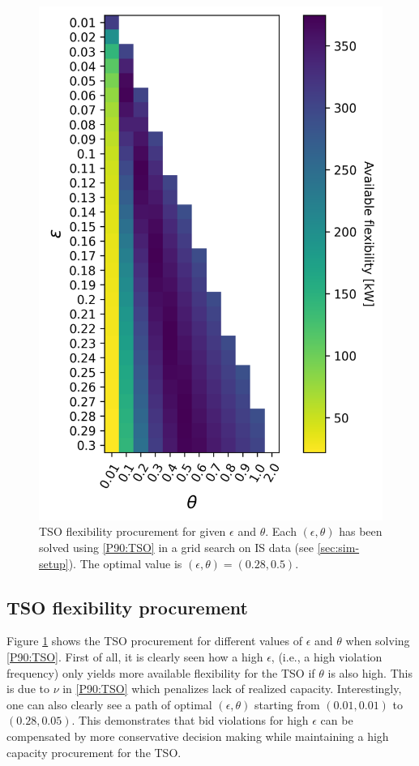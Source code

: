 \documentclass[conference]{IEEEtran}
\begin{document}
\begin{figure}[!t]
    \centering
    \includegraphics[width=0.95\columnwidth]{../figures/heatmap.png}
    \caption{\small{\ac{TSO} flexibility procurement for given $\epsilon$ and $\theta$. Each $(\epsilon, \theta)$ has been solved using \eqref{P90:TSO} in a grid search on \ac{IS} data (see \ref{sec:sim-setup}). The optimal value is $(\epsilon, \theta) = (0.28, 0.5)$. }}
    \label{fig:tso}
\end{figure}


\vspace{2mm}
\subsection{\ac{TSO} flexibility procurement}\label{sec:motivation}
\vspace{-1mm}
Figure \ref{fig:tso} shows the \ac{TSO} procurement for different values of $\epsilon$ and $\theta$ when solving \eqref{P90:TSO}. First of all, it is clearly seen how a high $\epsilon$, (i.e., a high violation frequency) only yields more available flexibility for the \ac{TSO} if $\theta$ is also high. This is due to $\nu$ in \eqref{P90:TSO} which penalizes lack of realized capacity. Interestingly, one can also clearly see a path of optimal $(\epsilon, \theta)$ starting from $(0.01, 0.01)$ to $(0.28, 0.05)$. This demonstrates that bid violations for high $\epsilon$ can be compensated by more conservative decision making while maintaining a high capacity procurement for the \ac{TSO}.
\end{document}
